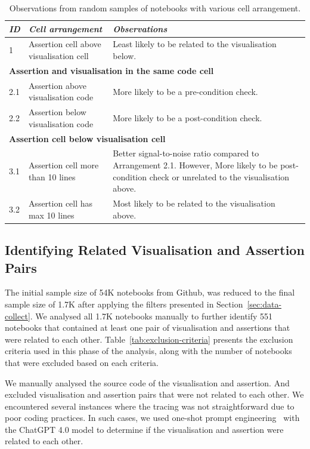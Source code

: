 \documentclass[conference]{IEEEtran}
\begin{document}
\begin{table}
  \centering
  \caption{Observations from random samples of notebooks with various
  cell arrangement.}
  \begin{tabular}{l p{} p{}}
    \hline
    \emph{\textbf{ID}}&
    \emph{\textbf{Cell arrangement}} &
    \emph{\textbf{Observations}}\\
    \hline
    1 &
    Assertion cell above visualisation cell &
    Least likely to be related to the visualisation below.\\
    \hline
    \multicolumn{3}{l}{\textbf{Assertion and visualisation in the same code cell}}\\
    \hline
    2.1 &
    Assertion above visualisation code &
    More likely to be a pre-condition check.\\
    2.2 &
    Assertion below visualisation code &
    More likely to be a post-condition check.\\
    \hline
    \multicolumn{3}{l}{\textbf{Assertion cell below visualisation cell}}\\
    \hline
    3.1 &
    Assertion cell more than 10 lines &
    Better signal-to-noise ratio compared to Arrangement 2.1. However, More likely to be post-condition check or unrelated to the visualisation above.\\
    3.2 &
    Assertion cell has max 10 lines &
    Most likely to be related to the visualisation above.\\
    \hline
  \end{tabular}
  \label{tab:cell-arrangement}
\end{table}

\subsection{Identifying Related Visualisation and Assertion Pairs}\label{sec:identify-related-pairs}

The initial sample size of 54K notebooks from Github, was reduced to
the final sample size of 1.7K after applying the filters presented in
Section~\ref{sec:data-collect}. We analysed all 1.7K notebooks
manually to further identify 551 notebooks that contained at least one
pair of visualisation and assertions that were related to each
other. Table~\ref{tab:exclusion-criteria} presents the exclusion
criteria used in this phase of the analysis, along with the number of
notebooks that were excluded based on each criteria.

We manually analysed the source code of the visualisation and
assertion. And excluded visualisation and assertion pairs that were
not related to each other. We encountered several instances where the
tracing was not straightforward due to poor coding practices. In such
cases, we used one-shot prompt engineering~\cite{CITME} with the
ChatGPT 4.0 model to determine if the visualisation and assertion were
related to each other.
\end{document}
